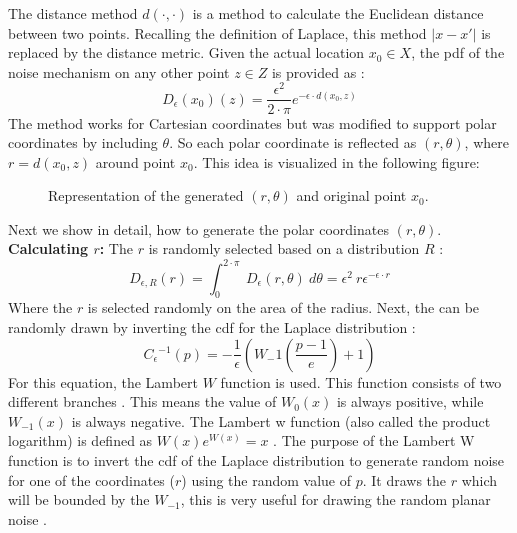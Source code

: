 The distance method $d(\cdot, \cdot)$ is a method to calculate the Euclidean distance between two points.
Recalling the definition of Laplace, this method $|x-x'|$ is replaced by the distance metric.
Given the actual location $x_0 \in X$, the \gls{pdf} of the noise mechanism on any other point $z \in Z$ is provided as \citep{DBLP:journals/corr/abs-1212-1984}: 
\begin{equation}
  D_\epsilon(x_0)(z) = \frac{\epsilon^2}{2 \cdot \pi}e^{-\epsilon \cdot d(x_0, z)}
  \label{eq:polar-laplace-pdf}
\end{equation}
The method works for Cartesian coordinates but was modified to support polar coordinates by including $\theta$.
So each polar coordinate is reflected as $(r, \theta)$, where $r = d(x_0, z)$ around point $x_0$.
This idea is visualized in the following figure:
\begin{figure}[H]
  
  \centering
  \caption{Representation of the generated $(r,\theta)$ and original point $x_0$.}
  \label{figure:parea}
\end{figure}
Next we show in detail, how to generate the polar coordinates $(r, \theta)$. \newline
\textbf{Calculating $r$:}
The $r$ is randomly selected based on a distribution $R$ \citep{DBLP:journals/corr/abs-1212-1984}: 
\begin{equation}
    D_{\epsilon, R}(r) = \int^{2\cdot \pi}_0 \ D_\epsilon(r, \theta) \ d\theta = \epsilon^2 \ r \epsilon^{-\epsilon \cdot r}
    \label{2d:generate-r}
\end{equation}
Where the $r$ is selected randomly on the area of the radius. 
Next, the can be randomly drawn by inverting the \gls{cdf} for the Laplace distribution \citep{DBLP:journals/corr/abs-1212-1984}:
\begin{equation}
  C{_\epsilon}{^{-1}}(p) = - \frac{1}{\epsilon}(W_-1 (\frac{p - 1}{e}) + 1)
  \label{eq:lambert_w_1}
\end{equation}
For this equation, the Lambert $W$ function is used. This function consists of two different branches \citep{corless_lambertw_1996}. This means the value of $W_0(x)$ is always positive, while $W_{-1}(x)$ is always negative. The Lambert w function (also called the product logarithm) is defined as $W(x)e^{W(x)} = x$ \citep{lehtonen_lambert_2016}.
The purpose of the Lambert W function is to invert the \gls{cdf} of the Laplace distribution to generate random noise for one of the coordinates ($r$) using the random value of $p$. It draws the $r$ which will be bounded by the $W_{-1}$, this is very useful for drawing the random planar noise \citep{corless_lambertw_1996}.

